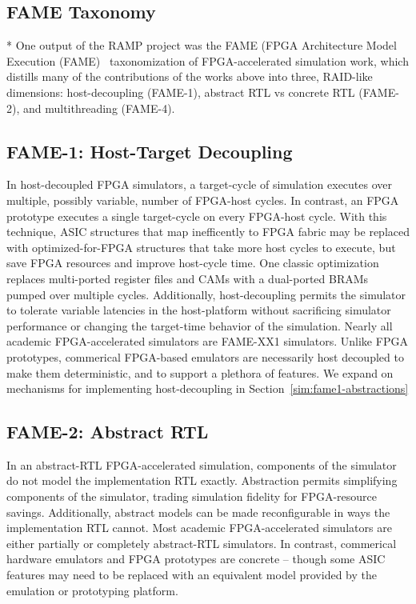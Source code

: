 \subsection{FAME Taxonomy}

* One output of the RAMP project was the FAME (FPGA Architecture Model
Execution (FAME)~\cite{FAME} taxonomization of FPGA-accelerated simulation work,
which distills many of the contributions of the works above into three,
RAID-like dimensions: host-decoupling (FAME-1), abstract RTL vs concrete RTL
(FAME-2), and multithreading (FAME-4).

\subsection{FAME-1: Host-Target Decoupling}\label{sec:fame1}

In host-decoupled FPGA simulators, a target-cycle of simulation
executes over multiple, possibly variable, number of FPGA-host cycles. In contrast, an
FPGA prototype executes a single target-cycle on every FPGA-host cycle. With
this technique, ASIC structures that map inefficently to FPGA fabric may be replaced
with optimized-for-FPGA structures that take more host cycles to execute, but save
FPGA resources and improve host-cycle time.  One classic optimization replaces
multi-ported register files and CAMs with a dual-ported BRAMs pumped over
multiple cycles.  Additionally, host-decoupling permits the simulator to
tolerate variable latencies in the host-platform without sacrificing simulator
performance or changing the target-time behavior of the simulation.
Nearly all academic FPGA-accelerated simulators are FAME-XX1 simulators.
Unlike FPGA prototypes, commerical FPGA-based emulators are necessarily host decoupled to
make them deterministic, and to support a plethora of features.
We expand on mechanisms for implementing host-decoupling in Section~\ref{sim:fame1-abstractions}

\subsection{FAME-2: Abstract RTL}

In an abstract-RTL FPGA-accelerated simulation, components of the simulator do
not model the implementation RTL exactly. Abstraction permits simplifying
components of the simulator, trading simulation fidelity for FPGA-resource
savings. Additionally, abstract models can be made reconfigurable in ways the
implementation RTL cannot. Most academic FPGA-accelerated simulators are either
partially or completely abstract-RTL simulators.  In contrast, commerical
hardware emulators and FPGA prototypes are concrete -- though some ASIC features
may need to be replaced with an equivalent model provided by the emulation or
prototyping platform.

